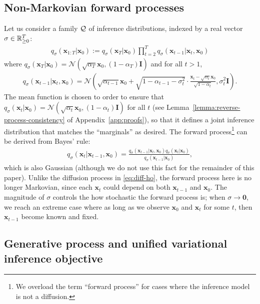 \subsection{Non-Markovian forward processes} 
Let us consider a family ${\mathcal{Q}}$ of inference distributions, %
indexed by a real vector $\sigma \in \mathbb{R}_{\geq 0}^{T}$:
\begin{gather}
    q_\sigma(\bm{x}_{1:T} | \bm{x}_0) := q_\sigma(\bm{x}_T | \bm{x}_0) \prod_{t=2}^{T} q_\sigma(\bm{x}_{t-1} | \bm{x}_{t}, \bm{x}_0) \label{eq:diff-new}
\end{gather}
where $q_\sigma(\bm{x}_{T} | \bm{x}_0) = \mathcal{N}(\sqrt{\alpha_T} \bm{x}_0, (1 - \alpha_T) \bm{I})$ and for all $t > 1$,
\begin{gather} 
   q_\sigma(\bm{x}_{t-1} | \bm{x}_t, \bm{x}_0) = \mathcal{N}\left(\sqrt{\alpha_{t-1}} \bm{x}_{0} + \sqrt{1 - \alpha_{t-1} - \sigma^2_t} \cdot {\frac{\bm{x}_{t}  - \sqrt{\alpha_{t}} \bm{x}_0}{\sqrt{1 - \alpha_{t}}}}, \sigma_t^2 \bm{I} \right). \label{eq:reversed-close-form}
\end{gather}
The mean function is chosen to order to ensure that $q_\sigma(\bm{x}_{t} | \bm{x}_0) = \mathcal{N}(\sqrt{\alpha_t} \bm{x}_0, (1 - \alpha_t) \bm{I})$ for all $t$ 
(see Lemma~\ref{lemma:reverse-process-consistency} of Appendix~\ref{app:proofs}), so that it defines a joint inference distribution that matches the ``marginals'' as desired. %
The forward process\footnote{We overload the term ``forward process'' for cases where the inference model is not a diffusion.} can be derived from Bayes' rule:
\begin{align}
    q_\sigma(\bm{x}_{t} | \bm{x}_{t-1}, \bm{x}_0) = \frac{q_\sigma(\bm{x}_{t-1} | \bm{x}_{t}, \bm{x}_0) q_\sigma(\bm{x}_{t} | \bm{x}_0)}{q_\sigma(\bm{x}_{t-1} | \bm{x}_0)}, \label{eq:bayes-rule}
\end{align}
which is %
also Gaussian (although we do not use this fact for the remainder of this paper).
Unlike the diffusion process in \eqref{eq:diff-ho}, %
the forward process here is no longer Markovian, since each $\bm{x}_t$ could depend on both $\bm{x}_{t-1}$ and $\bm{x}_0$. The magnitude of $\sigma$ controls the how stochastic the forward process is; when $\sigma \to \bm{0}$, %
we reach an extreme case where as long as we observe $\bm{x}_0$ and $\bm{x}_t$ for some $t$, then $\bm{x}_{t-1}$ become known and fixed. %



\subsection{Generative process and unified variational inference objective}


